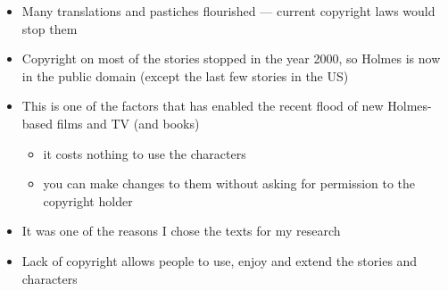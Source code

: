 \documentclass[a4paper,landscape,headrule,footrule,xetex]{foils}
\begin{document}
\begin{itemize}
\item Many translations and pastiches flourished --- current copyright
  laws would stop them
\item Copyright on most of the stories stopped in the year 2000, so
  Holmes is now in the public domain (except the last few stories in the US)
\item This is one of the factors that has enabled the recent flood of
  new Holmes-based films and TV (and books)
  \begin{itemize}
  \item it costs nothing to use the characters
  \item you can make changes to them without asking for permission to
    the copyright holder
  \end{itemize}
\item It was one of the reasons I chose the texts for my research
\item Lack of copyright allows people to use, enjoy and extend the stories and characters
\end{itemize}


\begin{center}
\end{center}

\end{document}
